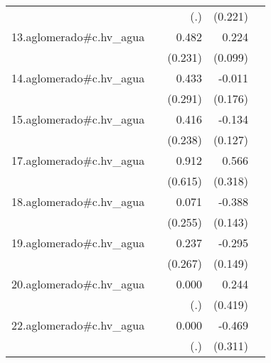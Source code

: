 {\begin{longtable}{l*{4}{D{.}{.}{-1}}}
            &                     &         (.)         &     (0.221)         &                     \\
\addlinespace
13.aglomerado#c.hv\_agua&                     &       0.482\sym{*}  &       0.224\sym{*}  &                     \\
            &                     &     (0.231)         &     (0.099)         &                     \\
\addlinespace
14.aglomerado#c.hv\_agua&                     &       0.433         &      -0.011         &                     \\
            &                     &     (0.291)         &     (0.176)         &                     \\
\addlinespace
15.aglomerado#c.hv\_agua&                     &       0.416         &      -0.134         &                     \\
            &                     &     (0.238)         &     (0.127)         &                     \\
\addlinespace
17.aglomerado#c.hv\_agua&                     &       0.912         &       0.566         &                     \\
            &                     &     (0.615)         &     (0.318)         &                     \\
\addlinespace
18.aglomerado#c.hv\_agua&                     &       0.071         &      -0.388\sym{**} &                     \\
            &                     &     (0.255)         &     (0.143)         &                     \\
\addlinespace
19.aglomerado#c.hv\_agua&                     &       0.237         &      -0.295\sym{*}  &                     \\
            &                     &     (0.267)         &     (0.149)         &                     \\
\addlinespace
20.aglomerado#c.hv\_agua&                     &       0.000         &       0.244         &                     \\
            &                     &         (.)         &     (0.419)         &                     \\
\addlinespace
22.aglomerado#c.hv\_agua&                     &       0.000         &      -0.469         &                     \\
            &                     &         (.)         &     (0.311)         &                     \\

\end{longtable}}
